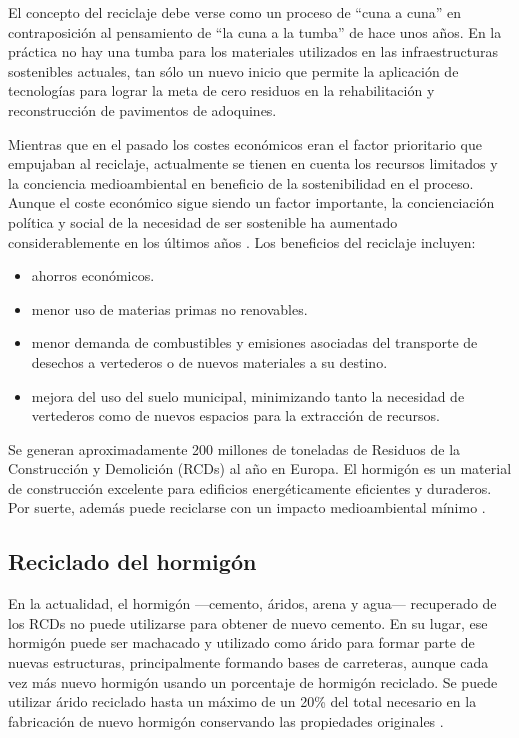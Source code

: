 El concepto del reciclaje debe verse como un proceso de ``cuna a cuna'' en contraposición al pensamiento de ``la cuna a la tumba'' de hace unos años. En la práctica no hay una tumba para los materiales utilizados en las infraestructuras sostenibles actuales, tan sólo un nuevo inicio que permite la aplicación de tecnologías para lograr la meta de cero residuos en la rehabilitación y reconstrucción de pavimentos de adoquines.

Mientras que en el pasado los costes económicos eran el factor prioritario que empujaban al reciclaje, actualmente se tienen en cuenta los recursos limitados y la conciencia medioambiental en beneficio de la sostenibilidad en el proceso. Aunque el coste económico sigue siendo un factor importante, la concienciación política y social de la necesidad de ser sostenible ha aumentado considerablemente en los últimos años \cite{sustpave}. Los beneficios del reciclaje incluyen:

\begin{itemize}
  \item ahorros económicos.
  \item menor uso de materias primas no renovables.
  \item menor demanda de combustibles y emisiones asociadas del transporte de desechos a vertederos o de nuevos materiales a su destino.
  \item mejora del uso del suelo municipal, minimizando tanto la necesidad de vertederos como de nuevos espacios para la extracción de recursos.
\end{itemize}

Se generan aproximadamente 200 millones de toneladas de Residuos de la Construcción y Demolición (RCDs) al año en Europa. El hormigón es un material de construcción excelente para edificios energéticamente eficientes y duraderos. Por suerte, además puede reciclarse con un impacto medioambiental mínimo \cite{europeanconcrete}.

\subsection{Reciclado del hormigón}

En la actualidad, el hormigón —cemento, áridos, arena y agua— recuperado de los RCDs no puede utilizarse para obtener de nuevo cemento. En su lugar, ese hormigón puede ser machacado y utilizado como árido para formar parte de nuevas estructuras, principalmente formando bases de carreteras, aunque cada vez más nuevo hormigón usando un porcentaje de hormigón reciclado. Se puede utilizar árido reciclado hasta un máximo de un 20\% del total necesario en la fabricación de nuevo hormigón conservando las propiedades originales \cite{europeanconcrete}.


